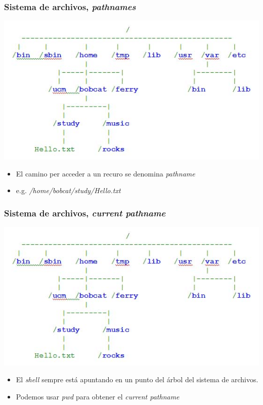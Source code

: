 \documentclass[colorlinks,10pt]{beamer}
\begin{document}
\begin{frame}
  \frametitle{Sistema de archivos, \emph{pathnames}}
  
      \begin{center}
        \includegraphics[width=1\textwidth]{figs/filesystemb} 
      \end{center} 
      \begin{itemize}
      \item El camino per acceder a un recuro se denomina \emph{pathname}
      \item e.g. \emph{/home/bobcat/study/Hello.txt}
      \end{itemize}
\end{frame}




\begin{frame}
  \frametitle{Sistema  de archivos, \emph{current pathname}}
  
      \begin{center}
        \includegraphics[width=1\textwidth]{figs/filesystemb} 
      \end{center} 
      \begin{itemize}
      \item El \emph{shell} sempre está apuntando en un punto del árbol 
        del sistema de archivos.
      \item Podemos usar \emph{pwd} para obtener el \emph{current pathname}
      \end{itemize}
\end{frame}
\end{document}
